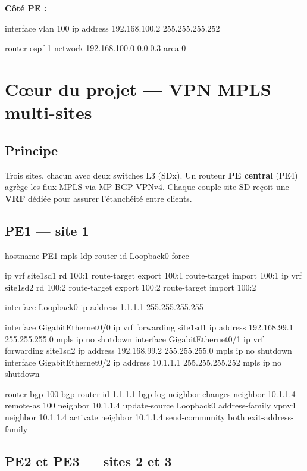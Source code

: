 \documentclass[11pt,a4paper]{article}
\begin{document}
\textbf{Côté PE :}
\begin{ciscobox}
interface vlan 100
 ip address 192.168.100.2 255.255.255.252

router ospf 1
 network 192.168.100.0 0.0.0.3 area 0
\end{ciscobox}

\section{Cœur du projet — VPN MPLS multi-sites}

\subsection{Principe}

Trois sites, chacun avec deux switches L3 (SDx). Un routeur \textbf{PE central} (PE4) agrège les flux MPLS via MP-BGP VPNv4. Chaque couple site-SD reçoit une \textbf{VRF} dédiée pour assurer l'étanchéité entre clients.

\subsection{PE1 — site 1}

\begin{ciscobox}
hostname PE1
mpls ldp router-id Loopback0 force

ip vrf site1sd1
 rd 100:1
 route-target export 100:1
 route-target import 100:1
ip vrf site1sd2
 rd 100:2
 route-target export 100:2
 route-target import 100:2

interface Loopback0
 ip address 1.1.1.1 255.255.255.255

interface GigabitEthernet0/0
 ip vrf forwarding site1sd1
 ip address 192.168.99.1 255.255.255.0
 mpls ip
 no shutdown
interface GigabitEthernet0/1
 ip vrf forwarding site1sd2
 ip address 192.168.99.2 255.255.255.0
 mpls ip
 no shutdown
interface GigabitEthernet0/2
 ip address 10.1.1.1 255.255.255.252
 mpls ip
 no shutdown

router bgp 100
 bgp router-id 1.1.1.1
 bgp log-neighbor-changes
 neighbor 10.1.1.4 remote-as 100
 neighbor 10.1.1.4 update-source Loopback0
 address-family vpnv4
  neighbor 10.1.1.4 activate
  neighbor 10.1.1.4 send-community both
 exit-address-family
\end{ciscobox}

\subsection{PE2 et PE3 — sites 2 et 3}
\end{document}
